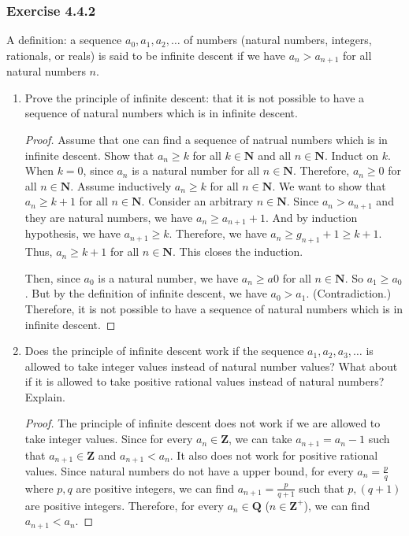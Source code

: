 \documentclass[12pt, letter]{article}
\begin{document}
\subsubsection*{Exercise 4.4.2}
A definition: a sequence $a_0,a_1,a_2,\dotsc$ of numbers (natural numbers, integers, rationals, or reals) is said to be infinite descent if we have $a_n>a_{n+1}$ for all
natural numbers $n$.
\begin{enumerate}[label=(\alph*)]
    \item Prove the principle of infinite descent: that it is not possible to have a sequence of natural numbers which is in infinite descent.
    \begin{proof}
        Assume that one can find a sequence of natrual numbers which is in infinite descent. Show that $a_n\geq k$ for all $k\in\mathbf{N}$ and all $n\in\mathbf{N}$. Induct on $k$. When $k=0$, since $a_n$ is a natural 
        number for all $n\in\mathbf{N}$. Therefore, $a_n\geq 0$ for all $n\in\mathbf{N}$. Assume inductively $a_n\geq k$ for all $n\in\mathbf{N}$. We want to show that $a_n\geq k+1$ for all $n\in\mathbf{N}$.
        Consider an arbitrary $n\in\mathbf{N}$. Since $a_n>a_{n+1}$ and they are natural numbers, we have $a_n\geq a_{n+1}+1$. And by induction hypothesis, we have $a_{n+1}\geq k$. Therefore, we have $a_n\geq g_{n+1}+1\geq k+1$. 
        Thus, $a_n\geq k+1$ for all $n\in\mathbf{N}$. This closes the induction. 
        
        Then, since $a_0$ is a natural number, we have $a_n\geq a0$ for all $n\in\mathbf{N}$. So $a_1\geq a_0$. But by the definition of infinite descent, we have $a_0>a_1$. (Contradiction.)
        Therefore, it is not possible to have a sequence of natural numbers which is in infinite descent.
    \end{proof}
    \item Does the principle of infinite descent work if the sequence $a_1,a_2,a_3,\dotsc$ is allowed to take integer values instead of natural number values? What about if it is allowed 
    to take positive rational values instead of natural numbers? Explain.
    \begin{proof}
        The principle of infinite descent does not work if we are allowed to take integer values. Since for every $a_n\in \mathbf{Z}$, we can take $a_{n+1}=a_n-1$ such that $a_{n+1}\in\mathbf{Z}$ and $a_{n+1}<a_n$. 
        It also does not work for positive rational values. Since natural numbers do not have a upper bound, for every $a_n=\frac{p}{q}$ where $p,q$ are positive integers, we can find $a_{n+1}=\frac{p}{q+1}$ such that 
        $p,(q+1)$ are positive integers. Therefore, for every $a_n\in\mathbf{Q}$ ($n\in \mathbf{Z}^+$), we can find $a_{n+1}<a_n$. 
    \end{proof}
\end{enumerate}
\end{document}
